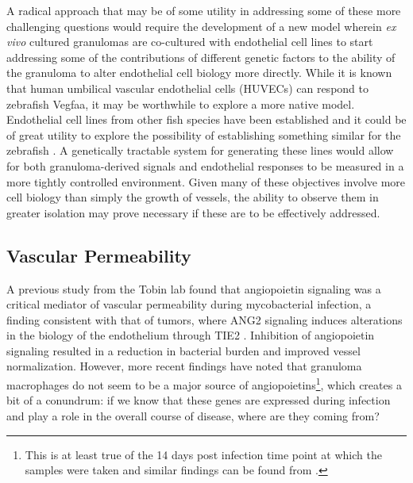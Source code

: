 A radical approach that may be of some utility in addressing some of these more challenging questions would require the development of a new model wherein \textit{ex vivo} cultured granulomas are co-cultured with endothelial cell lines to start addressing some of the contributions of different genetic factors to the ability of the granuloma to alter endothelial cell biology more directly. While it is known that human umbilical vascular endothelial cells (HUVECs) can respond to zebrafish Vegfaa, it may be worthwhile to explore a more native model. Endothelial cell lines from other fish species have been established and it could be of great utility to explore the possibility of establishing something similar for the zebrafish \citep{Pham2017, Luque2014}. A genetically tractable system for generating these lines would allow for both granuloma-derived signals and endothelial responses to be measured in a more tightly controlled environment. Given many of these objectives involve more cell biology than simply the growth of vessels, the ability to observe them in greater isolation may prove necessary if these are to be effectively addressed.

\subsection{Vascular Permeability}

\citep{Akwii2021, Augustin2009, Huang2010, ParkWindhol2016, Saharinen2017, Thurston2012}
\citep{ClaessonWelsh2015}
\citep{Eklund2017}
\citep{Hato2008}

A previous study from the Tobin lab found that angiopoietin signaling was a critical mediator of vascular permeability during mycobacterial infection, a finding consistent with that of tumors, where ANG2 signaling induces alterations in the biology of the endothelium through TIE2 \citep{Oehlers2017, Duran2021, Goel2012}. Inhibition of angiopoietin signaling resulted in a reduction in bacterial burden and improved vessel normalization. However, more recent findings have noted that granuloma macrophages do not seem to be a major source of angiopoietins\footnote{This is at least true of the 14 days post infection time point at which the samples were taken and similar findings can be found from \citet{Gideon2022}.}, which creates a bit of a conundrum: if we know that these genes are expressed during infection and play a role in the overall course of disease, where are they coming from? \citep{Cronan2021} 

